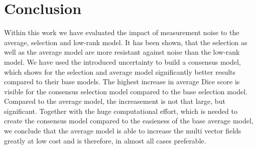 \section{Conclusion}
Within this work we have evaluated the impact of measurement noise to the
average, selection and low-rank model. It has been shown, that the selection as
well as the average model are more resistant against noise than the low-rank
model. 
We have used the introduced uncertainty
to build a consensus model, which shows for the selection and average model
significantly better results compared to their base models. 
The highest increase in average Dice score is visible for the consensus
selection model compared to the base selection model. Compared to the average
model, the increasement is not that large, but significant. Together with the
huge computational effort, which is needed to create the consensus model
compared to the easieness of the base average model, we conclude that the
average model is able to increase the multi vector fields greatly at low cost
and is therefore, in almost all cases preferable. 

